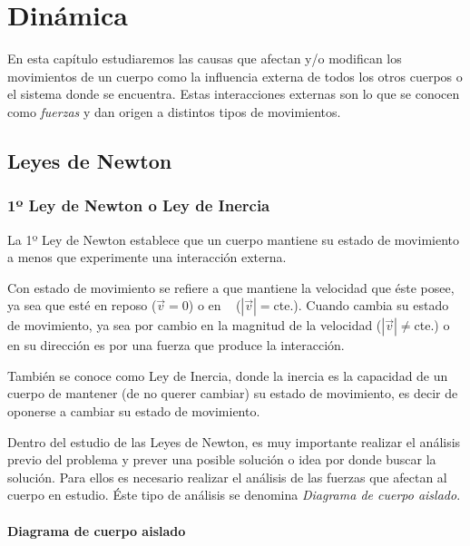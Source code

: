 
\chapter{Dinámica}

En esta capítulo estudiaremos las causas que afectan y/o modifican los
movimientos de un cuerpo como la influencia externa de todos los otros cuerpos o
el sistema donde se encuentra.
Estas interacciones externas son lo que se conocen como \emph{fuerzas} y dan
origen a distintos tipos de movimientos.

\section{Leyes de Newton}
\label{c.ln}

\subsection{1º Ley de Newton o Ley de Inercia}
\label{c.1ln}

\begin{tcolorbox}[colback=black!5!white,colframe=red!35!black]
La 1º Ley de Newton establece que un cuerpo mantiene su estado de movimiento a
menos que experimente una interacción externa.
\end{tcolorbox}

Con estado de movimiento se refiere a que mantiene la velocidad que éste posee,
ya sea que esté en reposo ($\vec{v}=0$) o en \mru~ ($|\vec{v}|=$cte.). Cuando
cambia su estado de movimiento, ya sea por cambio en la magnitud de la velocidad
($|\vec{v}|\neq$cte.) o en su dirección es por una fuerza que produce la
interacción.

También se conoce como Ley de Inercia, donde la inercia es la capacidad de un
cuerpo de mantener (de no querer cambiar) su estado de movimiento, es decir de oponerse a
cambiar su estado de movimiento.

Dentro del estudio de las Leyes de Newton, es muy importante realizar el
análisis previo del problema y prever una posible solución o idea por donde
buscar la solución. Para ellos es necesario realizar el análisis de las fuerzas
que afectan al cuerpo en estudio. Éste tipo de análisis se denomina
\emph{Diagrama de cuerpo aislado}.

\subsubsection{Diagrama de cuerpo aislado}
\label{c.dca}

